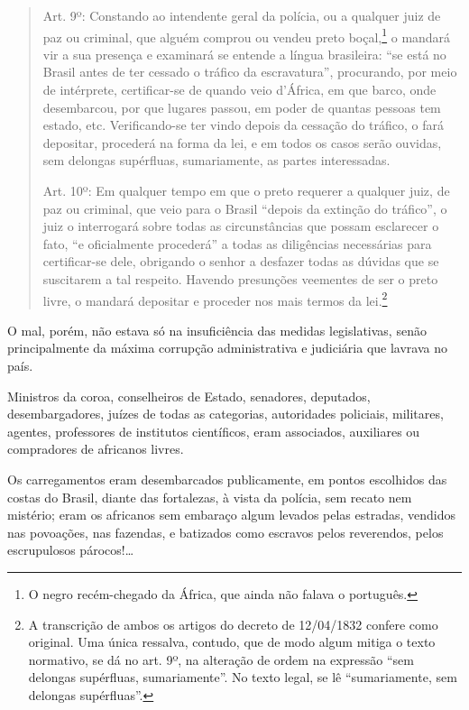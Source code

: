 \begin{quote}
Art. 9º: Constando ao intendente geral da polícia, ou a qualquer juiz
de paz ou criminal, que alguém comprou ou vendeu preto boçal,\footnote{
  O negro recém-chegado da África, que ainda não falava o português.} o
mandará vir a sua presença e examinará se entende a língua brasileira:
``se está no Brasil antes de ter cessado o tráfico da escravatura'',
procurando, por meio de intérprete, certificar-se de quando veio
d'África, em que barco, onde desembarcou, por que lugares passou, em
poder de quantas pessoas tem estado, etc. Verificando-se ter vindo
depois da cessação do tráfico, o fará depositar, procederá na forma da
lei, e em todos os casos serão ouvidas, sem delongas supérfluas,
sumariamente, as partes interessadas.

Art. 10º: Em qualquer tempo em que o preto requerer a qualquer juiz, de
paz ou criminal, que veio para o Brasil ``depois da extinção do tráfico'',
o juiz o interrogará sobre todas as circunstâncias que possam esclarecer
o fato, ``e oficialmente procederá'' a todas as diligências necessárias
para certificar-se dele, obrigando o senhor a desfazer todas as dúvidas
que se suscitarem a tal respeito. Havendo presunções veementes de ser o
preto livre, o mandará depositar e proceder nos mais termos da
lei.\footnote{A transcrição de ambos os artigos do decreto de
  12/04/1832 confere como original. Uma única ressalva, contudo, que de
  modo algum mitiga o texto normativo, se dá no art. 9º, na alteração
  de ordem na expressão ``sem delongas supérfluas, sumariamente''. No
  texto legal, se lê ``sumariamente, sem delongas
  supérfluas''.}
\end{quote}  

O mal, porém, não estava só na insuficiência das medidas legislativas,
senão principalmente da máxima corrupção administrativa e judiciária que
lavrava no país.

Ministros da coroa, conselheiros de Estado, senadores, deputados,
desembargadores, juízes de todas as categorias, autoridades policiais,
militares, agentes, professores de institutos científicos, eram
associados, auxiliares ou compradores de africanos livres.

Os carregamentos eram desembarcados publicamente, em pontos escolhidos
das costas do Brasil, diante das fortalezas, à vista da polícia, sem
recato nem mistério; eram os africanos sem embaraço algum levados pelas
estradas, vendidos nas povoações, nas fazendas, e batizados como
escravos pelos reverendos, pelos escrupulosos párocos!\ldots{}

